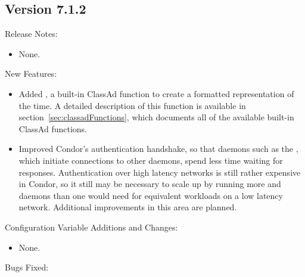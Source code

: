 \subsection*{\label{sec:New-7-1-2}Version 7.1.2}

\noindent Release Notes:

\begin{itemize}

\item None.

\end{itemize}


\noindent New Features:

\begin{itemize}

\item Added , a built-in ClassAd function to create a
  formatted representation of the time.  A detailed description of this
  function is available in section~\ref{sec:classadFunctions}, which
  documents all of the available built-in ClassAd functions.

\item Improved Condor's authentication handshake, so that daemons such
as the , which initiate connections to other daemons,
spend less time waiting for responses.
Authentication over high latency
networks is still rather expensive in Condor, so it still may be
necessary to scale up by running more  and 
daemons than one would need for equivalent workloads on a low latency network.
Additional improvements in this area are planned.

\end{itemize}

\noindent Configuration Variable Additions and Changes:

\begin{itemize}

\item None.

\end{itemize}

\noindent Bugs Fixed:

